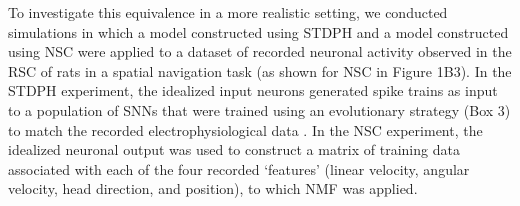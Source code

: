 To investigate this equivalence
in a more realistic setting,
we conducted simulations in which a model constructed using \ac{STDPH}
and a model  constructed using \ac{NSC}
were applied to a dataset of recorded neuronal activity 
observed in the \ac{RSC} of rats in a  spatial navigation task 
(as shown for \ac{NSC} in Figure 1B3). 
In the \ac{STDPH} experiment, the idealized input neurons generated spike trains as input to a population of SNNs that were trained using an evolutionary strategy (Box 3) to match the recorded electrophysiological data \citep{Rounds2016}. In the \ac{NSC} experiment, the idealized neuronal output was used to construct a matrix of training data associated with each of the four recorded `features' (linear velocity, angular velocity, head direction, and position), to which \ac{NMF} was applied. 


